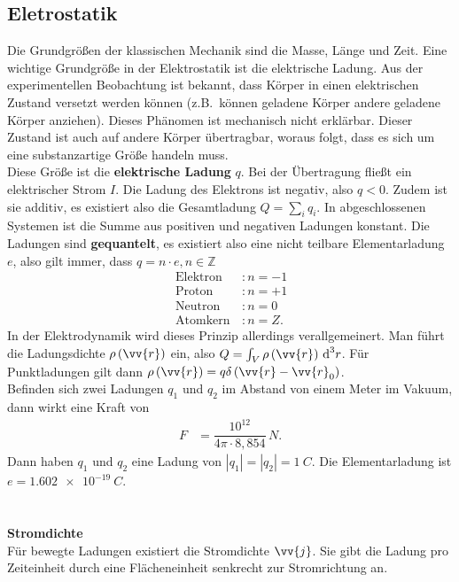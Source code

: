 \documentclass[a4paper,12pt]{article}
\newcommand{\td}{\,\text{d}}
\numberwithin{equation}{section}
\begin{document}
\subsection{Eletrostatik}
Die Grundgrößen der klassischen Mechanik sind die Masse, Länge und Zeit.
Eine wichtige Grundgröße in der Elektrostatik ist die elektrische Ladung. 
Aus der experimentellen Beobachtung ist bekannt, dass Körper in einen elektrischen Zustand versetzt werden können (z.B.\ können geladene Körper andere geladene Körper anziehen).
Dieses Phänomen ist mechanisch nicht erklärbar.
Dieser Zustand ist auch auf andere Körper übertragbar, woraus folgt, dass es sich um eine substanzartige Größe handeln muss.
\\\indent Diese Größe ist die \textbf{elektrische Ladung} $q$.
Bei der Übertragung fließt ein elektrischer Strom $I$.
Die Ladung des Elektrons ist negativ, also $q<0$.
Zudem ist sie additiv, es existiert also die Gesamtladung $Q=\sum_{i}^{}q_i$.
In abgeschlossenen Systemen ist die Summe aus positiven und negativen Ladungen konstant.
Die Ladungen sind \textbf{gequantelt}, es existiert also eine nicht teilbare Elementarladung $e$, also gilt immer, dass $q=n\cdot e,n  \in \mathbb{Z}$
\begin{align*} 
        \,\text{Elektron}\,&:n=-1\\
        \,\text{Proton}\,&:n=+1\\
        \,\text{Neutron}\,&:n=0\\
        \,\text{Atomkern}\,&:n=Z
.\end{align*} 
In der Elektrodynamik wird dieses Prinzip allerdings verallgemeinert.
Man führt die Ladungsdichte $\rho \left(\vv{r}\right)$ ein, also $Q=\int_{V}^{}\rho \left(\vv{r}\right)\td ^3r$.
Für Punktladungen gilt dann $\rho \left(\vv{r}\right)=q\delta \left(\vv{r}-\vv{r}_0\right)$.\\\indent
Befinden sich zwei Ladungen $q_1$ und $q_2$ im Abstand von einem Meter im Vakuum, dann wirkt eine Kraft von
\begin{align} 
        F&=\dfrac{10^{12}}{4\pi \cdot 8,854}\,\unit{N}
.\end{align} 
Dann haben $q_1$ und $q_2$ eine Ladung von $|q_1|=|q_2|=\SI{1}{C}$.
Die Elementarladung ist $e=\SI{1,602e-19}{C}$.\\\indent
\\\hfill\\\textbf{Stromdichte}\\ 
Für bewegte Ladungen existiert die Stromdichte $\vv{j}$.
Sie gibt die Ladung pro Zeiteinheit durch eine Flächeneinheit senkrecht zur Stromrichtung an.
\end{document}
